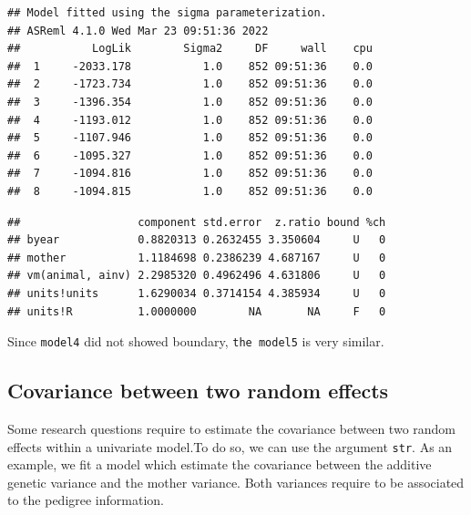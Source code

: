 \documentclass[
  12pt,
]{book}
\newenvironment{Shaded}{\begin{snugshade}}{\end{snugshade}}
\newcommand{\KeywordTok}[1]{\textcolor[rgb]{0.13,0.29,0.53}{\textbf{#1}}}
\newcommand{\NormalTok}[1]{#1}
\newcommand{\OperatorTok}[1]{\textcolor[rgb]{0.81,0.36,0.00}{\textbf{#1}}}
\begin{document}
\begin{verbatim}
## Model fitted using the sigma parameterization.
## ASReml 4.1.0 Wed Mar 23 09:51:36 2022
##           LogLik        Sigma2     DF     wall    cpu
##  1     -2033.178           1.0    852 09:51:36    0.0
##  2     -1723.734           1.0    852 09:51:36    0.0
##  3     -1396.354           1.0    852 09:51:36    0.0
##  4     -1193.012           1.0    852 09:51:36    0.0
##  5     -1107.946           1.0    852 09:51:36    0.0
##  6     -1095.327           1.0    852 09:51:36    0.0
##  7     -1094.816           1.0    852 09:51:36    0.0
##  8     -1094.815           1.0    852 09:51:36    0.0
\end{verbatim}

\begin{Shaded}
\end{Shaded}

\begin{verbatim}
##                  component std.error  z.ratio bound %ch
## byear            0.8820313 0.2632455 3.350604     U   0
## mother           1.1184698 0.2386239 4.687167     U   0
## vm(animal, ainv) 2.2985320 0.4962496 4.631806     U   0
## units!units      1.6290034 0.3714154 4.385934     U   0
## units!R          1.0000000        NA       NA     F   0
\end{verbatim}

Since \texttt{model4} did not showed boundary, \texttt{the\ model5} is very similar.

\hypertarget{covariance-between-two-random-effects}{%
\subsection{Covariance between two random effects}\label{covariance-between-two-random-effects}}

Some research questions require to estimate the covariance between two random effects within a univariate model.To do so, we can use the argument \texttt{str}.
As an example, we fit a model which estimate the covariance between the additive genetic variance and the mother variance. Both variances require to be associated to the pedigree information.
\end{document}
